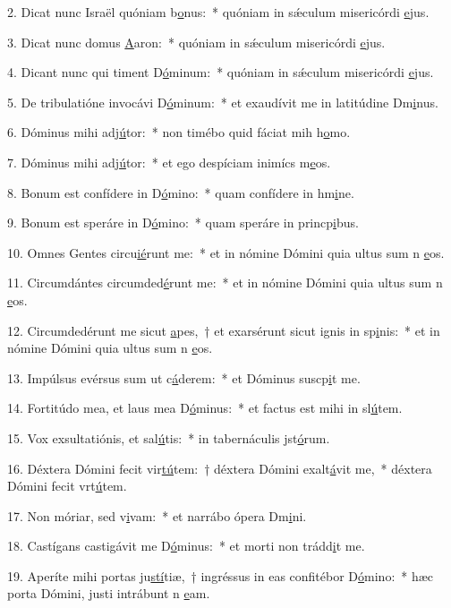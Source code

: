 2. Dicat nunc Israël quóniam b\uline{o}nus:~* quóniam in sǽculum misericórdi \uline{e}jus.\par 
3. Dicat nunc domus \uline{A}aron:~* quóniam in sǽculum misericórdi \uline{e}jus.\par 
4. Dicant nunc qui timent D\uline{ó}minum:~* quóniam in sǽculum misericórdi \uline{e}jus.\par 
5. De tribulatióne invocávi D\uline{ó}minum:~* et exaudívit me in latitúdine Dm\uline{i}nus.\par 
6. Dóminus mihi adj\uline{ú}tor:~* non timébo quid fáciat mih h\uline{o}mo.\par 
7. Dóminus mihi adj\uline{ú}tor:~* et ego despíciam inimícs m\uline{e}os.\par 
8. Bonum est confídere in D\uline{ó}mino:~* quam confídere in hm\uline{i}ne.\par 
9. Bonum est speráre in D\uline{ó}mino:~* quam speráre in princp\uline{i}bus.\par 
10. Omnes Gentes circu\uline{ié}runt me:~* et in nómine Dómini quia ultus sum n \uline{e}os.\par 
11. Circumdántes circumded\uline{é}runt me:~* et in nómine Dómini quia ultus sum n \uline{e}os.\par 
12. Circumdedérunt me sicut \uline{a}pes,~† et exarsérunt sicut ignis in sp\uline{i}nis:~* et in nómine Dómini quia ultus sum n \uline{e}os.\par 
13. Impúlsus evérsus sum ut c\uline{á}derem:~* et Dóminus suscp\uline{i}t me.\par 
14. Fortitúdo mea, et laus mea D\uline{ó}minus:~* et factus est mihi in sl\uline{ú}tem.\par 
15. Vox exsultatiónis, et sal\uline{ú}tis:~* in tabernáculis jst\uline{ó}rum.\par 
16. Déxtera Dómini fecit vir\uline{tú}tem:~† déxtera Dómini exalt\uline{á}vit me,~* déxtera Dómini fecit vrt\uline{ú}tem.\par 
17. Non móriar, sed v\uline{i}vam:~* et narrábo ópera Dm\uline{i}ni.\par 
18. Castígans castigávit me D\uline{ó}minus:~* et morti non trádd\uline{i}t me.\par 
19. Aperíte mihi portas ju\uline{stí}tiæ,~† ingréssus in eas confitébor D\uline{ó}mino:~* hæc porta Dómini, justi intrábunt n \uline{e}am.\par 
